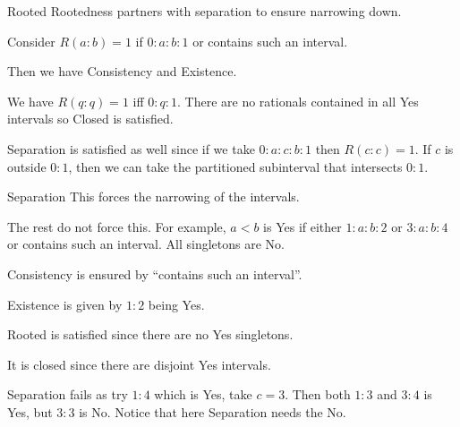 \documentclass{beamer}
\begin{document}
\begin{frame}{Rooted}
     Rootedness partners with separation to ensure narrowing down. 

     Consider $R(a:b) = 1$ if $0:a:b:1$ or contains such an interval. 

     Then we have Consistency and Existence. 

     We have $R(q:q) = 1$ iff $0:q:1$. There are no rationals contained in all Yes intervals so Closed is satisfied. 

     Separation is satisfied as well since if we take $0:a:c:b:1$ then $R(c:c)=1$. If $c$ is outside $0:1$, then we can take the partitioned subinterval that intersects $0:1$.
\end{frame}



\begin{frame}{Separation}
    This forces the narrowing of the intervals. 

    The rest do not force this. For example, $a<b$ is Yes if either $1:a:b:2$ or $3:a:b:4$ or contains such an interval. All singletons are No.

    Consistency is ensured by ``contains such an interval''.
    
    Existence is given by $1:2$ being Yes.

    Rooted is satisfied since there are no Yes singletons. 
    
    It is closed since there are disjoint Yes intervals. 

    Separation fails as try $1:4$ which is Yes, take $c = 3$. Then both $1:3$ and $3:4$ is Yes, but $3:3$ is No. Notice that here Separation needs the No. 
    
\end{frame}



%
%    
%    
\end{document}
